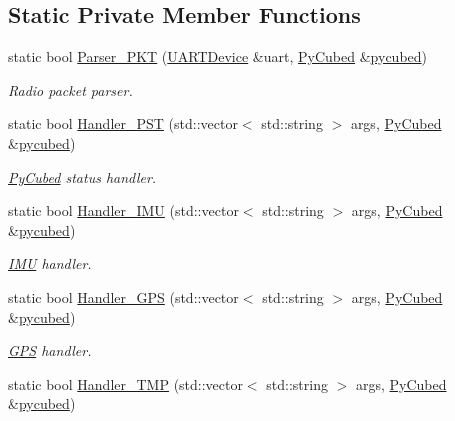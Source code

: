 \subsection*{Static Private Member Functions}
\begin{DoxyCompactItemize}
\item 
static bool \hyperlink{classcubesat_1_1PyCubed_ac58a739fdf572f272776164304dc951f}{Parser\+\_\+\+P\+KT} (\hyperlink{classcubesat_1_1UARTDevice}{U\+A\+R\+T\+Device} \&uart, \hyperlink{classcubesat_1_1PyCubed}{Py\+Cubed} \&\hyperlink{pycubed__test_8cpp_ae8c4c37e7742557f28bffebe72eeef5e}{pycubed})
\begin{DoxyCompactList}\small\item\em Radio packet parser. \end{DoxyCompactList}\item 
static bool \hyperlink{classcubesat_1_1PyCubed_a1813883ff40761bffd3bdadbeac3c0ce}{Handler\+\_\+\+P\+ST} (std\+::vector$<$ std\+::string $>$ args, \hyperlink{classcubesat_1_1PyCubed}{Py\+Cubed} \&\hyperlink{pycubed__test_8cpp_ae8c4c37e7742557f28bffebe72eeef5e}{pycubed})
\begin{DoxyCompactList}\small\item\em \hyperlink{classcubesat_1_1PyCubed}{Py\+Cubed} status handler. \end{DoxyCompactList}\item 
static bool \hyperlink{classcubesat_1_1PyCubed_a4b4e36d9d30fc8c95030bdb8f6946c5e}{Handler\+\_\+\+I\+MU} (std\+::vector$<$ std\+::string $>$ args, \hyperlink{classcubesat_1_1PyCubed}{Py\+Cubed} \&\hyperlink{pycubed__test_8cpp_ae8c4c37e7742557f28bffebe72eeef5e}{pycubed})
\begin{DoxyCompactList}\small\item\em \hyperlink{classcubesat_1_1IMU}{I\+MU} handler. \end{DoxyCompactList}\item 
static bool \hyperlink{classcubesat_1_1PyCubed_a60c99d1ef8b6a6b4e5721f18348b60dd}{Handler\+\_\+\+G\+PS} (std\+::vector$<$ std\+::string $>$ args, \hyperlink{classcubesat_1_1PyCubed}{Py\+Cubed} \&\hyperlink{pycubed__test_8cpp_ae8c4c37e7742557f28bffebe72eeef5e}{pycubed})
\begin{DoxyCompactList}\small\item\em \hyperlink{classcubesat_1_1GPS}{G\+PS} handler. \end{DoxyCompactList}\item 
static bool \hyperlink{classcubesat_1_1PyCubed_a29cb9887d439e8fe784ebf9bc66187d9}{Handler\+\_\+\+T\+MP} (std\+::vector$<$ std\+::string $>$ args, \hyperlink{classcubesat_1_1PyCubed}{Py\+Cubed} \&\hyperlink{pycubed__test_8cpp_ae8c4c37e7742557f28bffebe72eeef5e}{pycubed})

\end{DoxyCompactItemize}
